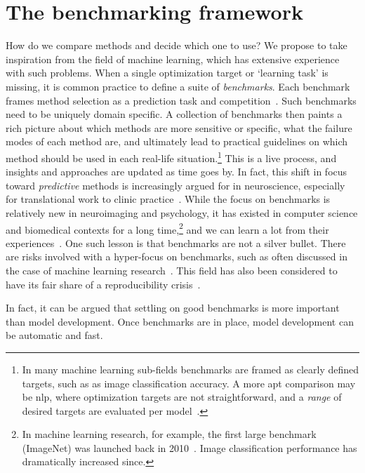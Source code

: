 \clearpage
\section{The benchmarking framework}\label{sec:benchmark-framework}

How do we compare methods and decide which one to use?
We propose to take inspiration from the field of machine learning, which has extensive experience with such problems.
%
When a single optimization target or `learning task' is missing, it is common practice to define a suite of \emph{benchmarks}.
Each benchmark frames method selection as a prediction task and competition~\parencite{Breiman2001, Shmueli2010, Bzdok2018, Khosla2019, Poldrack2020, Tejavibulya2022}.
Such benchmarks need to be uniquely domain specific.
A collection of benchmarks then paints a rich picture about which methods are more sensitive or specific, what the failure modes of each method are, and ultimately lead to practical guidelines on which method should be used in each real-life situation.\footnote{In many machine learning sub-fields benchmarks are framed as clearly defined targets, such as as image classification accuracy. A more apt comparison may be \gls{nlp}, where optimization targets are not straightforward, and a \emph{range} of desired targets are evaluated per model~\parencite[see e.g.][]{Bommasani2021}.}
This is a live process, and insights and approaches are updated as time goes by.
%
In fact, this shift in focus toward \emph{predictive} methods is increasingly argued for in neuroscience, especially for translational work to clinic practice~\parencite{Yarkoni2017, Leenings2022, Voytek2022}.
While the focus on benchmarks is relatively new in neuroimaging and psychology, it has existed in computer science and biomedical contexts for a long time,\footnote{In machine learning research, for example, the first large benchmark (ImageNet) was launched back in 2010~\parencite{Deng2009}. Image classification performance has dramatically increased since.} and we can learn a lot from their experiences~\parencite{Leenings2022}.
%
One such lesson is that benchmarks are not a silver bullet.
There are risks involved with a hyper-focus on benchmarks, such as often discussed in the case of machine learning research~\parencite{Wagstaff2012, Sculley2018}.
This field has also been considered to have its fair share of a reproducibility crisis~\parencite[see also][]{Bell2021}.

In fact, it can be argued that settling on good benchmarks is more important than model development.
Once benchmarks are in place, model development can be automatic and fast.

